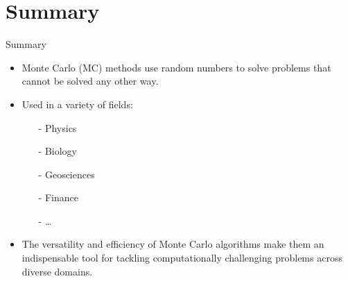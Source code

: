 \documentclass{beamer}
\begin{document}

    \section{Summary}
    \begin{frame}{Summary}
        \vspace{2em}
        \begin{itemize}
            \item <1-> Monte Carlo (MC) methods use random numbers to solve problems that cannot be solved any other way.
            \item <2-> Used in a variety of fields:
            \begin{itemize}
                \item[-] Physics
                \item[-] Biology
                \item[-] Geosciences
                \item[-] Finance
                \item[-] \dots
            \end{itemize}
            \item <3-> The versatility and efficiency of Monte Carlo algorithms make them an indispensable tool for tackling computationally challenging problems across diverse domains.
        \end{itemize}
    \end{frame}
\end{document}
